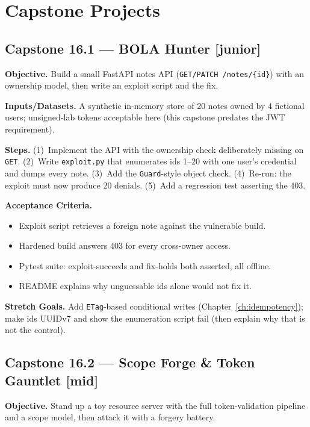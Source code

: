\section{Capstone Projects}
\label{sec:ch16-capstones}

\subsection*{Capstone 16.1 --- BOLA Hunter \textbf{[junior]}}

\textbf{Objective.} Build a small FastAPI notes API (\texttt{GET/PATCH
/notes/\{id\}}) with an ownership model, then write an exploit script and
the fix.

\textbf{Inputs/Datasets.} A synthetic in-memory store of 20 notes owned by
4 fictional users; unsigned-lab tokens acceptable here (this capstone
predates the JWT requirement).

\textbf{Steps.} (1)~Implement the API with the ownership check
deliberately missing on \texttt{GET}. (2)~Write \texttt{exploit.py} that
enumerates ids 1--20 with one user's credential and dumps every note.
(3)~Add the \texttt{Guard}-style object check. (4)~Re-run: the exploit
must now produce 20 denials. (5)~Add a regression test asserting the 403.

\textbf{Acceptance Criteria.}
\begin{itemize}[itemsep=0.2em]
  \item[$\square$] Exploit script retrieves a foreign note against the
        vulnerable build.
  \item[$\square$] Hardened build answers 403 for every cross-owner access.
  \item[$\square$] Pytest suite: exploit-succeeds and fix-holds both
        asserted, all offline.
  \item[$\square$] README explains why unguessable ids alone would not fix
        it.
\end{itemize}

\textbf{Stretch Goals.} Add \texttt{ETag}-based conditional writes
(Chapter~\ref{ch:idempotency}); make ids UUIDv7 and show the enumeration
script fail (then explain why that is not the control).

\subsection*{Capstone 16.2 --- Scope Forge \& Token Gauntlet \textbf{[mid]}}

\textbf{Objective.} Stand up a toy resource server with the full
token-validation pipeline and a scope model, then attack it with a
forgery battery.

